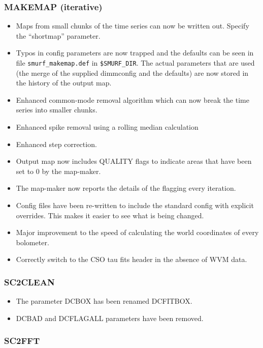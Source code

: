 \documentclass[oneside,11pt]{starlink}
\begin{document}
\subsubsection{MAKEMAP (iterative)}

\begin{itemize}
\item Maps from small chunks of the time series can now be written
  out. Specify the ``shortmap'' parameter.
\item Typos in config parameters are now trapped and the defaults can
  be seen in file \texttt{smurf\_makemap.def} in
  \texttt{\$SMURF\_DIR}. The actual parameters that are used (the
  merge of the supplied dimmconfig and the defaults) are now stored in
  the history of the output map.
\item Enhanced common-mode removal algorithm which can now break the
  time series into smaller chunks.
\item Enhanced spike removal using a rolling median calculation
\item Enhanced step correction.
\item Output map now includes QUALITY flags to indicate areas that
  have been set to 0 by the map-maker.
\item The map-maker now reports the details of the flagging every iteration.
\item Config files have been re-written to include the standard config
  with explicit overrides. This makes it easier to see what is being
  changed.
\item Major improvement to the speed of calculating the world
  coordinates of every bolometer.
\item Correctly switch to the CSO tau fits header in the absence of WVM data.
\end{itemize}

\subsubsection{SC2CLEAN}

\begin{itemize}
\item The parameter DCBOX has been renamed DCFITBOX.
\item DCBAD and DCFLAGALL parameters have been removed.
\end{itemize}

\subsubsection{SC2FFT}
\end{document}
